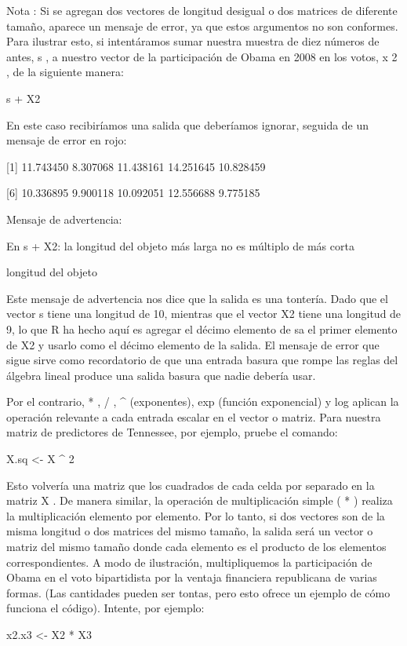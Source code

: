 \documentclass[
]{book}
\begin{document}
Nota : Si se agregan dos vectores de longitud desigual o dos matrices de diferente tamaño, aparece un mensaje de error, ya que estos argumentos no son conformes. Para ilustrar esto, si intentáramos sumar nuestra muestra de diez números de antes, s , a nuestro vector de la participación de Obama en 2008 en los votos, x 2 , de la siguiente manera:

s + X2

En este caso recibiríamos una salida que deberíamos ignorar, seguida de un mensaje de error en rojo:

{[}1{]} 11.743450 8.307068 11.438161 14.251645 10.828459

{[}6{]} 10.336895 9.900118 10.092051 12.556688 9.775185

Mensaje de advertencia:

En s + X2: la longitud del objeto más larga no es múltiplo de más corta

longitud del objeto

Este mensaje de advertencia nos dice que la salida es una tontería. Dado que el vector s tiene una longitud de 10, mientras que el vector X2 tiene una longitud de 9, lo que R ha hecho aquí es agregar el décimo elemento de sa el primer elemento de X2 y usarlo como el décimo elemento de la salida. El mensaje de error que sigue sirve como recordatorio de que una entrada basura que rompe las reglas del álgebra lineal produce una salida basura que nadie debería usar.

Por el contrario, * , / , \^{} (exponentes), exp (función exponencial) y log aplican la operación relevante a cada entrada escalar en el vector o matriz. Para nuestra matriz de predictores de Tennessee, por ejemplo, pruebe el comando:

X.sq \textless- X \^{} 2

Esto volvería una matriz que los cuadrados de cada celda por separado en la matriz X . De manera similar, la operación de multiplicación simple ( * ) realiza la multiplicación elemento por elemento. Por lo tanto, si dos vectores son de la misma longitud o dos matrices del mismo tamaño, la salida será un vector o matriz del mismo tamaño donde cada elemento es el producto de los elementos correspondientes. A modo de ilustración, multipliquemos la participación de Obama en el voto bipartidista por la ventaja financiera republicana de varias formas. (Las cantidades pueden ser tontas, pero esto ofrece un ejemplo de cómo funciona el código). Intente, por ejemplo:

x2.x3 \textless- X2 * X3
\end{document}
